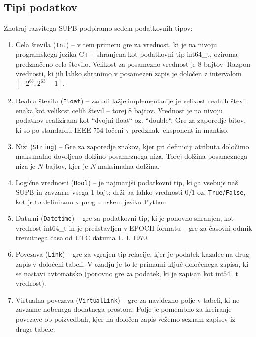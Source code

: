 \documentclass[a4paper,12pt,openright]{book}
\begin{document}
        \subsection{Tipi podatkov}
        Znotraj razvitega SUPB podpiramo sedem podatkovnih tipov:
        \begin{enumerate}
            \item Cela števila ({\tt Int}) – v tem primeru gre za vrednost, ki je na nivoju programskega jezika C++ shranjena kot podatkovni tip int64\_t, oziroma predznačeno celo število. Velikost za posamezno vrednost je 8 bajtov. Razpon vrednosti, ki jih lahko shranimo v posamezen zapis je določen z intervalom $[-2^{63}, 2^{63} - 1]$.
            \item Realna števila ({\tt Float}) – zaradi lažje implementacije je velikost realnih števil enaka kot velikost celih števil – torej 8 bajtov. Vrednost je na nivoju podatkov realizirana kot ``dvojni float`` oz. ``double``. Gre za zaporedje bitov, ki so po standardu IEEE 754 \cite{kahan1996ieee} ločeni v predznak, eksponent in mantiso.
            \item Nizi ({\tt String}) – Gre za zaporedje znakov, kjer pri definiciji atributa določimo maksimalno dovoljeno dolžino posameznega niza. Torej dolžina posameznega niza je $N$ bajtov, kjer je $N$ maksimalna dolžina.
            \item Logične vrednosti ({\tt Bool}) – je najmanjši podatkovni tip, ki ga vsebuje naš SUPB in zavzame vsega 1 bajt; drži pa lahko vrednosti $0/1$ oz. {\tt True/False}, kot je to definirano v programskem jeziku Python.
            \item Datumi ({\tt Datetime}) – gre za podatkovni tip, ki je ponovno shranjen, kot vrednost int64\_t in je predstavljen v EPOCH formatu \cite{EPOCH_FORMAT} – gre za časovni odmik trenutnega časa od UTC datuma 1. 1. 1970. 
            \item Povezava ({\tt Link}) – gre za vgrajen tip relacije, kjer je podatek kazalec na drug zapis v določeni tabeli. V ozadju je to le primarni ključ določenega zapisa, ki se nastavi avtomatsko (ponovno gre za podatek, ki je zapisan kot int64\_t vrednost).
            \item Virtualna povezava ({\tt VirtualLink}) – gre za navidezno polje v tabeli, ki ne zavzame nobenega dodatnega prostora. Polje je pomembno za kreiranje povezave ob poizvedbah, kjer na določen zapis vežemo seznam zapisov iz druge tabele.  
        \end{enumerate}
        
\end{document}
